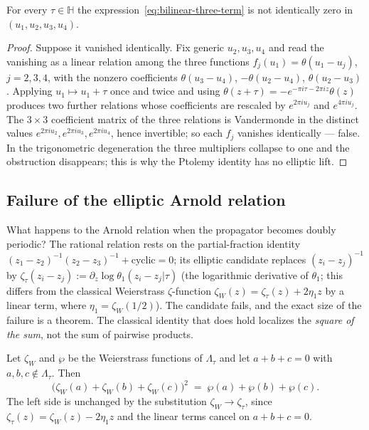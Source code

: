 \begin{lemma}
\label{lem:no-bilinear-fay}
For every $\tau \in \mathbb{H}$ the
expression~\eqref{eq:bilinear-three-term} is not identically zero in
$(u_1, u_2, u_3, u_4)$.
\end{lemma}

\begin{proof}
Suppose it vanished identically. Fix generic $u_2, u_3, u_4$ and read
the vanishing as a linear relation among the three functions
$f_j(u_1) = \theta(u_1 - u_j)$, $j = 2,3,4$, with the nonzero
coefficients $\theta(u_3{-}u_4)$, $-\theta(u_2{-}u_4)$,
$\theta(u_2{-}u_3)$. Applying $u_1 \mapsto u_1 + \tau$ once and twice
and using $\theta(z+\tau) = -e^{-\pi i\tau - 2\pi i z}\theta(z)$
produces two further relations whose coefficients are rescaled by
$e^{2\pi i u_j}$ and $e^{4\pi i u_j}$. The $3 \times 3$ coefficient
matrix of the three relations is Vandermonde in the distinct values
$e^{2\pi i u_2}, e^{2\pi i u_3}, e^{2\pi i u_4}$, hence invertible;
so each $f_j$ vanishes identically --- false. In the trigonometric
degeneration the three multipliers collapse to one and the
obstruction disappears; this is why the Ptolemy identity has no
elliptic lift.
\end{proof}


\subsection{Failure of the elliptic Arnold relation}

What happens to the Arnold relation when the propagator becomes
doubly periodic? The rational relation rests on the partial-fraction
identity $(z_1{-}z_2)^{-1}(z_2{-}z_3)^{-1} + \text{cyclic} = 0$; its
elliptic candidate replaces $(z_i - z_j)^{-1}$ by
$\zeta_\tau(z_i - z_j) := \partial_z \log\theta_1(z_i - z_j|\tau)$
(the logarithmic derivative of $\theta_1$; this differs from the
classical Weierstrass $\zeta$-function $\zeta_W(z) = \zeta_\tau(z)
+ 2\eta_1 z$ by a linear term, where $\eta_1 = \zeta_W(1/2)$). The
candidate fails, and the exact size of the failure is a theorem. The
classical identity that does hold localizes the \emph{square of the
sum}, not the sum of pairwise products.

\begin{proposition}\label{prop:zeta-square}
Let $\zeta_W$ and $\wp$ be the Weierstrass functions of
$\Lambda_\tau$ and let $a + b + c = 0$ with $a, b, c \notin
\Lambda_\tau$. Then
\begin{equation}\label{eq:zeta-square}
\bigl(\zeta_W(a) + \zeta_W(b) + \zeta_W(c)\bigr)^2
\;=\; \wp(a) + \wp(b) + \wp(c).
\end{equation}
The left side is unchanged by the substitution
$\zeta_W \to \zeta_\tau$, since $\zeta_\tau(z) = \zeta_W(z) -
2\eta_1 z$ and the linear terms cancel on $a + b + c = 0$.
\end{proposition}

